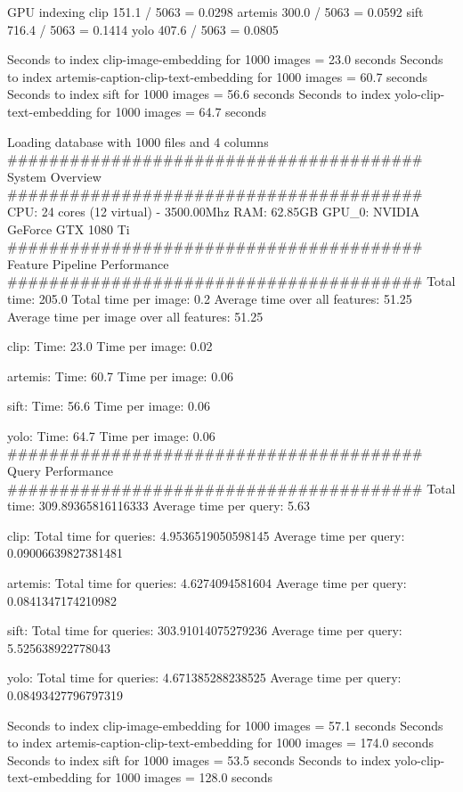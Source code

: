 GPU indexing
clip        151.1 / 5063      = 0.0298
artemis     300.0 / 5063      = 0.0592
sift        716.4 / 5063      = 0.1414
yolo        407.6 / 5063      = 0.0805










Seconds to index clip-image-embedding for 1000 images = 23.0 seconds
Seconds to index artemis-caption-clip-text-embedding for 1000 images = 60.7 seconds
Seconds to index sift for 1000 images = 56.6 seconds
Seconds to index yolo-clip-text-embedding for 1000 images = 64.7 seconds


Loading database with 1000 files and 4 columns
######################################## System Overview ########################################
CPU: 24 cores (12 virtual) - 3500.00Mhz
RAM: 62.85GB
GPU_0: NVIDIA GeForce GTX 1080 Ti
######################################## Feature Pipeline Performance ########################################
Total time: 205.0
Total time per image: 0.2
Average time over all features: 51.25
Average time per image over all features: 51.25

  clip:
  Time: 23.0
  Time per image: 0.02 

  artemis:
  Time: 60.7
  Time per image: 0.06 

  sift:
  Time: 56.6
  Time per image: 0.06 

  yolo:
  Time: 64.7
  Time per image: 0.06 
######################################## Query Performance ########################################
Total time: 309.89365816116333
Average time per query: 5.63

  clip:
  Total time for queries: 4.9536519050598145
  Average time per query: 0.09006639827381481

  artemis:
  Total time for queries: 4.6274094581604
  Average time per query: 0.0841347174210982

  sift:
  Total time for queries: 303.91014075279236
  Average time per query: 5.525638922778043

  yolo:
  Total time for queries: 4.671385288238525
  Average time per query: 0.08493427796797319














Seconds to index clip-image-embedding for 1000 images = 57.1 seconds
Seconds to index artemis-caption-clip-text-embedding for 1000 images = 174.0 seconds
Seconds to index sift for 1000 images = 53.5 seconds
Seconds to index yolo-clip-text-embedding for 1000 images = 128.0 seconds

